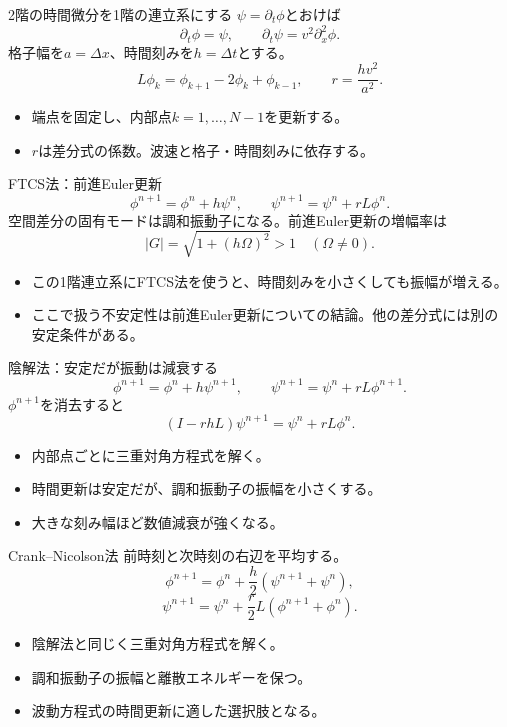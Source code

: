 \documentclass[12pt,aspectratio=43]{beamer}
\begin{document}
\begin{frame}[t]{2階の時間微分を1階の連立系にする}
  \(\psi=\partial_t\phi\)とおけば
  \[
    \partial_t\phi=\psi,\qquad
    \partial_t\psi=v^2\partial_x^2\phi.
  \]
  格子幅を\(a=\Delta x\)、時間刻みを\(h=\Delta t\)とする。
  \[
    L\phi_k=\phi_{k+1}-2\phi_k+\phi_{k-1},\qquad
    r=\frac{hv^2}{a^2}.
  \]
  \begin{itemize}
    \item 端点を固定し、内部点\(k=1,\ldots,N-1\)を更新する。
    \item \(r\)は差分式の係数。波速と格子・時間刻みに依存する。
  \end{itemize}
\end{frame}

\begin{frame}[t]{FTCS法：前進Euler更新}
  \[
    \phi^{n+1}=\phi^n+h\psi^n,\qquad
    \psi^{n+1}=\psi^n+rL\phi^n.
  \]
  空間差分の固有モードは調和振動子になる。前進Euler更新の増幅率は
  \[
    |G|=\sqrt{1+(h\Omega)^2}>1\quad(\Omega\ne0).
  \]
  \begin{itemize}
    \item この1階連立系にFTCS法を使うと、時間刻みを小さくしても振幅が増える。
    \item ここで扱う不安定性は前進Euler更新についての結論。他の差分式には別の安定条件がある。
  \end{itemize}
\end{frame}

\begin{frame}[t]{陰解法：安定だが振動は減衰する}
  \[
    \phi^{n+1}=\phi^n+h\psi^{n+1},\qquad
    \psi^{n+1}=\psi^n+rL\phi^{n+1}.
  \]
  \(\phi^{n+1}\)を消去すると
  \[
    (I-rhL)\psi^{n+1}=\psi^n+rL\phi^n.
  \]
  \begin{itemize}
    \item 内部点ごとに三重対角方程式を解く。
    \item 時間更新は安定だが、調和振動子の振幅を小さくする。
    \item 大きな刻み幅ほど数値減衰が強くなる。
  \end{itemize}
\end{frame}

\begin{frame}[t]{Crank--Nicolson法}
  前時刻と次時刻の右辺を平均する。
  \[
    \phi^{n+1}=\phi^n+\frac h2(\psi^{n+1}+\psi^n),
  \]
  \[
    \psi^{n+1}=\psi^n+\frac r2L(\phi^{n+1}+\phi^n).
  \]
  \begin{itemize}
    \item 陰解法と同じく三重対角方程式を解く。
    \item 調和振動子の振幅と離散エネルギーを保つ。
    \item 波動方程式の時間更新に適した選択肢となる。
  \end{itemize}
\end{frame}
\end{document}
